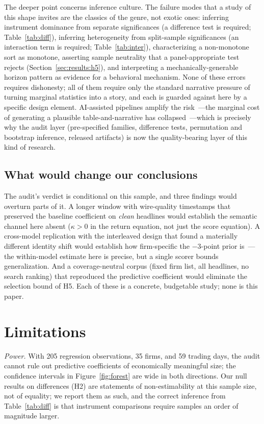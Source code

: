The deeper point concerns inference culture. The failure modes that a study of this shape invites are the classics of the genre, not exotic ones: inferring instrument dominance from separate significances (a difference test is required; Table~\ref{tab:diff}), inferring heterogeneity from split-sample significances (an interaction term is required; Table~\ref{tab:inter}), characterizing a non-monotone sort as monotone, asserting sample neutrality that a panel-appropriate test rejects (Section~\ref{sec:results:h5}), and interpreting a mechanically-generable horizon pattern as evidence for a behavioral mechanism. None of these errors requires dishonesty; all of them require only the standard narrative pressure of turning marginal statistics into a story, and each is guarded against here by a specific design element. AI-assisted pipelines amplify the risk~---the marginal cost of generating a plausible table-and-narrative has collapsed~---which is precisely why the audit layer (pre-specified families, difference tests, permutation and bootstrap inference, released artifacts) is now the quality-bearing layer of this kind of research.

\subsection{What would change our conclusions}

The audit's verdict is conditional on this sample, and three findings would overturn parts of it. A longer window with wire-quality timestamps that preserved the baseline coefficient on \emph{clean} headlines would establish the semantic channel here absent ($\kappa>0$ in the return equation, not just the score equation). A cross-model replication with the interleaved design that found a materially different identity shift would establish how firm-specific the $-3$-point prior is~---the within-model estimate here is precise, but a single scorer bounds generalization. And a coverage-neutral corpus (fixed firm list, all headlines, no search ranking) that reproduced the predictive coefficient would eliminate the selection bound of H5. Each of these is a concrete, budgetable study; none is this paper.
\section{Limitations}\label{sec:limitations}

\emph{Power.} With 205 regression observations, 35 firms, and 59 trading days, the audit cannot rule out predictive coefficients of economically meaningful size; the confidence intervals in Figure~\ref{fig:forest} are wide in both directions. Our null results on differences (H2) are statements of non-estimability at this sample size, not of equality; we report them as such, and the correct inference from Table~\ref{tab:diff} is that instrument comparisons require samples an order of magnitude larger.


